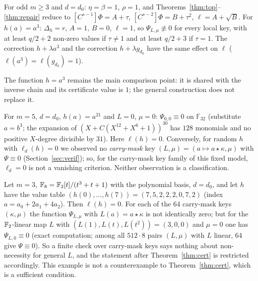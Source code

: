 \begin{corollary}[The case $d=d_0$]\label{cor:d0}
For odd $m\ge3$ and $d=d_0$: $\eta=\beta=1$, $\rho=1$, and Theorems~\ref{thm:top}--\ref{thm:repair} reduce to
$[C^{s-1}]\Phi=A+\tau$, $[C^{s-2}]\Phi=B+\tau^2$, $\ell=A+\sqrt B$. For $h(a)=a^3$: $\Delta_h=r$, $A=1$, $B=0$,
$\ell=1$, so $\Psi_{L,\mu}\not\equiv0$ for every local key, with at least $q/2+2$ non-zero values if $\tau\ne1$ and
at least $q/2+3$ if $\tau=1$. The correction $h+\lambda a^3$ and the correction $h+\lambda g_{d_0}$ have the same
effect on $\ell$ ($\ell(a^3)=\ell(g_{d_0})=1$).
\end{corollary}
The function $h=a^3$ remains the main comparison point: it is shared with the inverse chain and its
certificate value is $1$; the general construction does not replace it.

\begin{example}\label{dz:prop:X21}\label{ex:nonnec}
For $m=5$, $d=d_0$, $h(a)=a^{21}$ and $L=0$, $\mu=0$: $\Psi_{0,0}\equiv0$ on $\mathbb F_{32}$ (substitute $a=b^3$;
the expansion of $(X+C(X^{12}+X^6+1))^{30}$ has $128$ monomials and no positive $X$-degree divisible by $31$).
Here $\ell(h)=0$. Conversely, for random $h$ with $\ell_d(h)=0$ we observed no \emph{carry-mask} key
$(L,\mu)=(a\mapsto a\star\kappa,\mu)$ with $\Psi\equiv0$ (Section~\ref{sec:verif}); so, for the carry-mask key family of this fixed
model, $\ell_d=0$ is not a vanishing criterion. Neither observation is a classification.
\end{example}

\begin{example}\label{ex:quant}
Let $m=3$, $\mathbb F_8=\mathbb{F}_2[t]/(t^3+t+1)$ with the polynomial basis, $d=d_0$, and let $h$ have the value table
$(h(0),\dots,h(7))=(7,5,2,2,2,0,7,2)$ (index $a=a_0+2a_1+4a_2$). Then $\ell(h)=0$. For each of the $64$ carry-mask keys
$(\kappa,\mu)$ the function $\Psi_{L,\mu}$ with $L(a)=a\star\kappa$ is not identically zero; but for the $\mathbb{F}_2$-linear map $L$ with
$(L(1),L(t),L(t^2))=(3,0,0)$ and $\mu=0$ one has $\Psi_{L,0}\equiv0$ (exact computation; among all $512\cdot8$ pairs $(L,\mu)$ with $L$
linear, $64$ give $\Psi\equiv0$). So a finite check over carry-mask keys says nothing about non-necessity for general $L$, and the
statement after Theorem~\ref{thm:cert} is restricted accordingly. This example is not a counterexample to
Theorem~\ref{thm:cert}, which is a sufficient condition.
\end{example}
